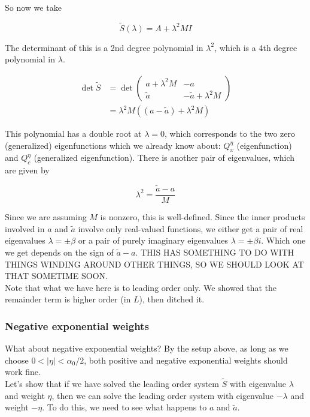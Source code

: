 \documentclass[12pt]{article}
\begin{document}
So now we take

\[
\tilde{S}(\lambda) = A + \lambda^2 MI
\]

The determinant of this is a 2nd degree polynomial in $\lambda^2$, which is a 4th degree polynomial in $\lambda$.

\begin{align*}
\det \tilde{S} &= \det \begin{pmatrix}
a + \lambda^2 M & -a \\ \tilde{a} & -\tilde{a} + \lambda^2 M 
\end{pmatrix} \\
&= \lambda^2 M ( (a - \tilde{a}) + \lambda^2 M)
\end{align*}

This polynomial has a double root at $\lambda = 0$, which corresponds to the two zero (generalized) eigenfunctions which we already know about: $Q^\eta_x$ (eigenfunction) and $Q^\eta_c$ (generalized eigenfunction). There is another pair of eigenvalues, which are given by

\[
\lambda^2 = \frac{\tilde{a} - a}{M}
\]

Since we are assuming $M$ is nonzero, this is well-defined. Since the inner products involved in $a$ and $\tilde{a}$ involve only real-valued functions, we either get a pair of real eigenvalues $\lambda = \pm \beta$ or a pair of purely imaginary eigenvalues $\lambda = \pm \beta i$. Which one we get depends on the sign of $\tilde{a} - a$. THIS HAS SOMETHING TO DO WITH THINGS WINDING AROUND OTHER THINGS, SO WE SHOULD LOOK AT THAT SOMETIME SOON.\\

Note that what we have here is to leading order only. We showed that the remainder term is higher order (in $L$), then ditched it.

\subsubsection*{Negative exponential weights}

What about negative exponential weights? By the setup above, as long as we choose $0 < |\eta| < \alpha_0/2$, both positive and negative exponential weights should work fine.\\

Let's show that if we have solved the leading order system $\tilde{S}$ with eigenvalue $\lambda$ and weight $\eta$, then we can solve the leading order system with eigenvalue $-\lambda$ and weight $-\eta$. To do this, we need to see what happens to $a$ and $\tilde{a}$.
\end{document}
